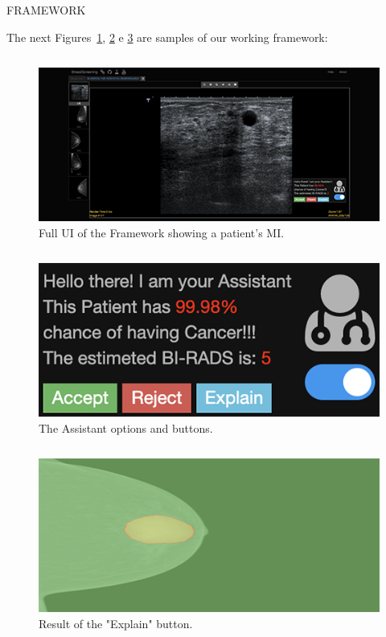 \documentclass[final]{beamer}
\begin{document}
\begin{frame}[t, fragile = singleslide]{}
\begin{columns}[t]
\end{columns}

\begin{columns}[t]

\begin{column}{0.945\textwidth}

\begin{block}{FRAMEWORK}

The next Figures~\ref{fig:fig002}, \ref{fig:fig003} e \ref{fig:fig004} are samples of our working framework:

\begin{column}[T]{0.33\textwidth}
\begin{figure}[!htb]
\centering
\caption{Full UI of the Framework showing a patient's MI.}
\label{fig:fig002}
\includegraphics[width = 0.75\columnwidth]{./figures/fig002}
\end{figure}
\end{column}
{\color{PosterBars}\vrule width 1.5pt}
\begin{column}[T]{0.33\textwidth}
\begin{figure}[!htb]
\centering
\caption{The Assistant options and buttons.}
\label{fig:fig003}
\includegraphics[width = 0.75\columnwidth]{./figures/fig003}
\end{figure}
\end{column}
{\color{PosterBars}\vrule width 1.5pt}
\begin{column}[T]{0.33\textwidth}
\begin{figure}[!htb]
\centering
\caption{Result of the "Explain" button.}
\label{fig:fig004}
\includegraphics[width = 0.75\columnwidth]{./figures/fig004}
\end{figure}
\end{column}


\end{block}
\end{column}
\end{columns}
\end{frame}
\end{document}
